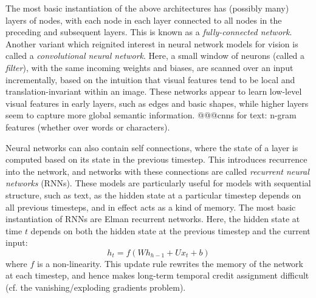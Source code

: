 The most basic instantiation of the above architectures has (possibly many) layers of nodes, with each node in each layer connected to all nodes in the preceding and subsequent layers. This is known as a \textit{fully-connected network}. Another variant which reignited interest in neural network models for vision is called a \textit{convolutional neural network}. Here, a small window of neurons (called a \textit{filter}), with the same incoming weights and biases, are scanned over an input incrementally, based on the intuition that visual features tend to be local and translation-invariant within an image. These networks appear to learn low-level visual features in early layers, such as edges and basic shapes, while higher layers seem to capture more global semantic information. @@@cnns for text: n-gram features (whether over words or characters).

Neural networks can also contain self connections, where the state of a layer is computed based on its state in the previous timestep. This introduces recurrence into the network, and networks with these connections are called \textit{recurrent neural networks} (RNNs). These models are particularly useful for models with sequential structure, such as text, as the hidden state at a particular timestep depends on all previous timesteps, and in effect acts as a kind of memory. The most basic instantiation of RNNs are Elman recurrent networks. Here, the hidden state at time $t$ depends on both the hidden state at the previous timestep and the current input:
\begin{equation}
    h_t = f(W h_{h-1} + U x_t + b)
    \label{eqn:rnn}
\end{equation}
where $f$ is a non-linearity. This update rule rewrites the memory of the network at each timestep, and hence makes long-term temporal credit assignment difficult (cf. the vanishing/exploding gradients problem).

